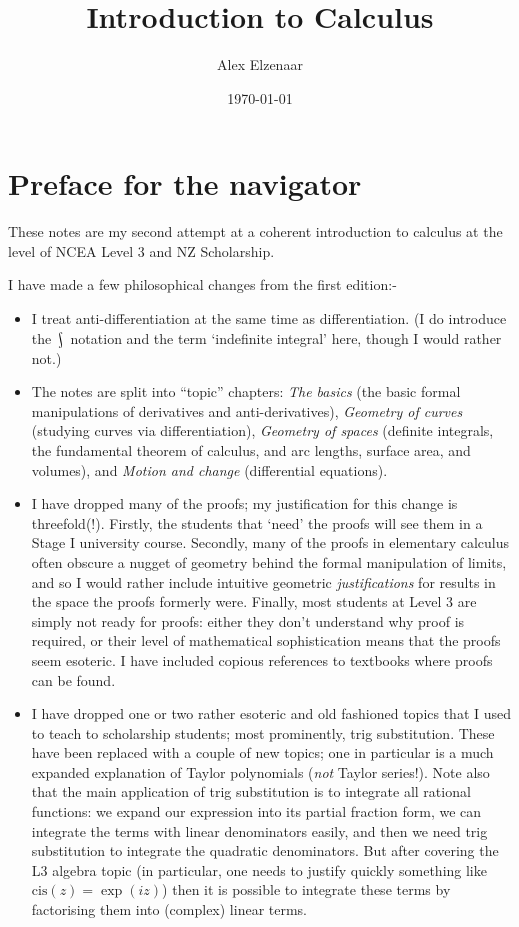 \documentclass[a4paper]{memoir}
\title{Introduction to Calculus}
\author{Alex Elzenaar}
\date{\today}
\theoremstyle{definition}
\DeclareMathOperator*{\rint}{\scalerel*{\rotatebox{17}{$\!\int\!$}}{\int}}
\newlength\drop
\newcommand*{\titleGM}{\begingroup%
\drop = 0.1\textheight
\vspace*{\baselineskip}
\vfill
  \hbox{%
  \hspace*{0.2\textwidth}%
  \rule{1pt}{\dimexpr\textheight-35pt\relax}%
  \hspace*{0.05\textwidth}%
\parbox[b]{0.75\textwidth}{
  \vbox{%
    \vspace{\drop}
    {\noindent\HUGE\bfseries Level Three\\[0.5\baselineskip] Calculus}\\[2\baselineskip]
    {\Large\itshape Second Edition}\\[4\baselineskip]
    {\Large ALEX ELZENAAR}\par
    \vspace{0.5\textheight}
    {\noindent \url{https://github.com/aelzenaar/ncea-notes}}\\[\baselineskip]
    }%
}%
  }%
\vfill
\null
\endgroup}
\begin{document}
\frontmatter

\begin{titlingpage}
  \titleGM
\end{titlingpage}


\chapter{Preface for the navigator}
These notes are my second attempt at a coherent introduction to calculus at the level of NCEA
Level 3 and NZ Scholarship.

I have made a few philosophical changes from the first edition:-
\begin{itemize}
  \item I treat anti-differentiation at the same time as differentiation. (I do introduce the $ \rint $ notation
        and the term `indefinite integral' here, though I would rather not.)
  \item The notes are split into ``topic'' chapters: \textit{The basics} (the basic formal manipulations
        of derivatives and anti-derivatives), \textit{Geometry of curves} (studying curves via differentiation),
        \textit{Geometry of spaces} (definite integrals, the fundamental theorem of calculus, and arc lengths,
        surface area, and volumes), and \textit{Motion and change} (differential equations).
  \item I have dropped many of the proofs; my justification for this change is threefold(!). Firstly,
        the students that `need' the proofs will see them in a Stage I university course. Secondly, many
        of the proofs in elementary calculus often obscure a nugget of geometry behind the formal manipulation
        of limits, and so I would rather include intuitive geometric \emph{justifications} for results in the
        space the proofs formerly were. Finally, most students at Level 3 are simply not ready for proofs: either
        they don't understand why proof is required, or their level of mathematical sophistication means that
        the proofs seem esoteric. I have included copious references to textbooks where proofs can be found.
  \item I have dropped one or two rather esoteric and old fashioned topics that I used to teach to scholarship
        students; most prominently, trig substitution. These have been replaced with a couple of new topics; one
        in particular is a much expanded explanation of Taylor polynomials (\emph{not} Taylor series!). Note also
        that the main application of trig substitution is to integrate all rational functions: we expand our
        expression into its partial fraction form, we can integrate the terms with linear denominators easily, and
        then we need trig substitution to integrate the quadratic denominators. But after covering the L3 algebra
        topic (in particular, one needs to justify quickly something like $ \mathrm{cis}(z) = \exp(iz) $) then it
        is possible to integrate these terms by factorising them into (complex) linear terms.
\end{itemize}
\end{document}
